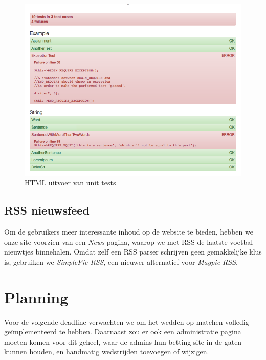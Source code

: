 \documentclass[11pt]{article}
\begin{document}
\begin{figure}[h!]
	\begin{center}
	\includegraphics[scale=0.39]{unit-tests.png}

	\caption{HTML uitvoer van unit tests}
	\label{fig:unit-tests}
	\end{center}
\end{figure}




\subsection{RSS nieuwsfeed}

Om de gebruikers meer interessante inhoud op de website te bieden, hebben we onze site voorzien van een \emph{News} pagina, waarop we met RSS de laatste voetbal nieuwtjes binnehalen. Omdat zelf een RSS parser schrijven geen gemakkelijke klus is, gebruiken we \emph{SimplePie RSS}, een nieuwer alternatief voor \emph{Magpie RSS}.



\section{Planning}

Voor de volgende deadline verwachten we om het wedden op matchen volledig ge\"implementeerd te hebben. Daarnaast zou er ook een administratie pagina moeten komen voor dit geheel, waar de admins hun betting site in de gaten kunnen houden, en handmatig wedstrijden toevoegen of wijzigen.
\end{document}
